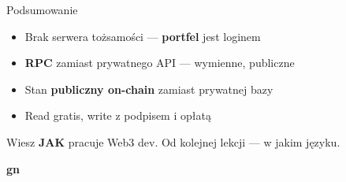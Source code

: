 \begin{frame}{Podsumowanie}
  \begin{itemize}
    \item Brak serwera tożsamości --- \textbf{portfel} jest loginem
    \item \textbf{RPC} zamiast prywatnego API --- wymienne, publiczne
    \item Stan \textbf{publiczny on-chain} zamiast prywatnej bazy
    \item Read gratis, write z podpisem i opłatą
  \end{itemize}
  \vspace{0.4cm}
  \begin{center}
    \textcolor{stplmuted}{Wiesz \textbf{JAK} pracuje Web3 dev.
    Od kolejnej lekcji --- w jakim języku.}
  \end{center}
\end{frame}

\begin{frame}[plain]
  \begin{center}
    \vfill
    {\Huge\bfseries\color{stplwhite} gn}
    \vfill
  \end{center}
\end{frame}


